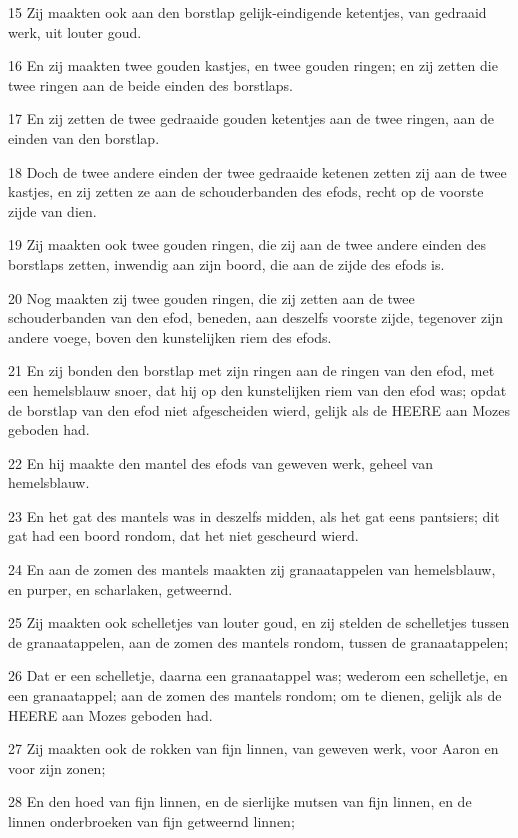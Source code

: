 \par 15 Zij maakten ook aan den borstlap gelijk-eindigende ketentjes, van gedraaid werk, uit louter goud.
\par 16 En zij maakten twee gouden kastjes, en twee gouden ringen; en zij zetten die twee ringen aan de beide einden des borstlaps.
\par 17 En zij zetten de twee gedraaide gouden ketentjes aan de twee ringen, aan de einden van den borstlap.
\par 18 Doch de twee andere einden der twee gedraaide ketenen zetten zij aan de twee kastjes, en zij zetten ze aan de schouderbanden des efods, recht op de voorste zijde van dien.
\par 19 Zij maakten ook twee gouden ringen, die zij aan de twee andere einden des borstlaps zetten, inwendig aan zijn boord, die aan de zijde des efods is.
\par 20 Nog maakten zij twee gouden ringen, die zij zetten aan de twee schouderbanden van den efod, beneden, aan deszelfs voorste zijde, tegenover zijn andere voege, boven den kunstelijken riem des efods.
\par 21 En zij bonden den borstlap met zijn ringen aan de ringen van den efod, met een hemelsblauw snoer, dat hij op den kunstelijken riem van den efod was; opdat de borstlap van den efod niet afgescheiden wierd, gelijk als de HEERE aan Mozes geboden had.
\par 22 En hij maakte den mantel des efods van geweven werk, geheel van hemelsblauw.
\par 23 En het gat des mantels was in deszelfs midden, als het gat eens pantsiers; dit gat had een boord rondom, dat het niet gescheurd wierd.
\par 24 En aan de zomen des mantels maakten zij granaatappelen van hemelsblauw, en purper, en scharlaken, getweernd.
\par 25 Zij maakten ook schelletjes van louter goud, en zij stelden de schelletjes tussen de granaatappelen, aan de zomen des mantels rondom, tussen de granaatappelen;
\par 26 Dat er een schelletje, daarna een granaatappel was; wederom een schelletje, en een granaatappel; aan de zomen des mantels rondom; om te dienen, gelijk als de HEERE aan Mozes geboden had.
\par 27 Zij maakten ook de rokken van fijn linnen, van geweven werk, voor Aaron en voor zijn zonen;
\par 28 En den hoed van fijn linnen, en de sierlijke mutsen van fijn linnen, en de linnen onderbroeken van fijn getweernd linnen;
